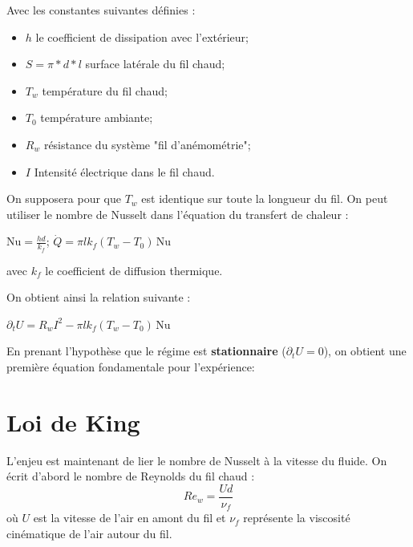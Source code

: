 \documentclass[12pt, a4paper]{report}
\begin{document}
	\noindent Avec les constantes suivantes définies :
	\vspace{1mm}
	\begin{itemize}
		\item $h$ le coefficient de dissipation avec l'extérieur;
		\item $S = \pi*d*l$ surface latérale du fil chaud;
		\item $T_w$ température du fil chaud;
		\item $T_0$ température ambiante;
		\item $R_w$ résistance du système "fil d'anémométrie";
		\item $I$ Intensité électrique dans le fil chaud.
	\end{itemize}
	\vspace{3mm}
	
	\noindent On supposera pour que $T_w$ est identique sur toute la longueur du fil. On peut utiliser le nombre de Nusselt dans l'équation du transfert de chaleur :
	\begin{center}
		$\mathrm{Nu} = \frac{h d}{k_f}$; \quad $\dot{Q} = \pi l k_f (T_w - T_0)\,\mathrm{Nu}$
	\end{center}
	avec $k_f$ le coefficient de diffusion thermique.
	\vspace{3mm}
	
	\noindent On obtient ainsi la relation suivante :
	\begin{center}
		$\partial_t U = R_w I^2 - \pi l k_f (T_w - T_0)\,\mathrm{Nu}$
	\end{center}
	
	\noindent En prenant l'hypothèse que le régime est \textbf{stationnaire} ($\partial_t U = 0 $), on obtient une première équation fondamentale pour l'expérience:
	\begin{center}
	\end{center}
	
	
	\section{Loi de King}
	
	L'enjeu est maintenant de lier le nombre de Nusselt à la vitesse du fluide. On écrit d'abord le nombre de Reynolds du fil chaud :
	\begin{equation*}
		Re_w = \frac{Ud}{\nu_f}
	\end{equation*}
	où $U$ est la vitesse de l'air en amont du fil et $\nu_f$ représente la viscosité cinématique de l'air autour du fil.\\
	
\end{document}
